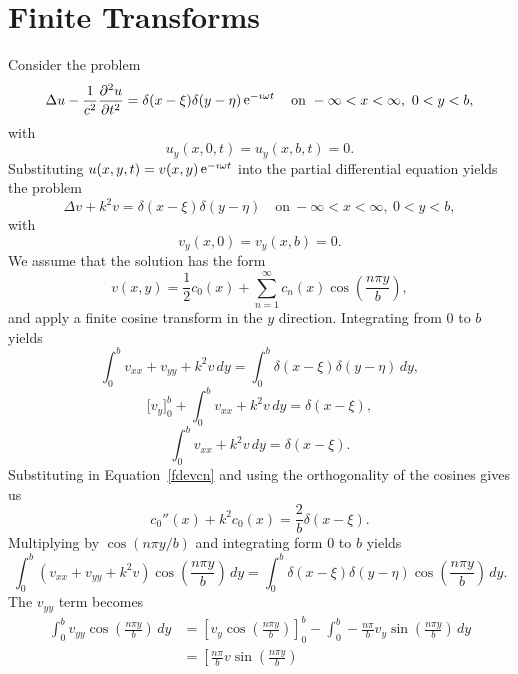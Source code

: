 \flushbottom




\chapter{Finite Transforms}





\begin{Example}
  Consider the problem
  \[
  \Delta u - \frac{1}{c^2} \frac{\partial^2 u}{\partial t^2} 
  = \delta(x-\xi)\delta(y-\eta) \mathop{\mathrm{e}}\nolimits^{-\imath \omega t} \quad \mathrm{on}\  
  -\infty < x < \infty,\ 0 < y < b,
  \]
  with
  \[
  u_y(x,0,t) = u_y(x,b,t) = 0.
  \]
  Substituting $u(x,y,t) = v(x,y) \mathop{\mathrm{e}}\nolimits^{-\imath \omega t}$ into the partial differential 
  equation yields the problem
  \[
  \Delta v + k^2 v 
  = \delta(x-\xi)\delta(y-\eta) \quad \mathrm{on}\  
  -\infty < x < \infty,\ 0 < y < b,
  \]
  with
  \[
  v_y(x,0) = v_y(x,b) = 0.
  \]
  We assume that the solution has the form
  \begin{equation}
    \label{fdevcn}
    v(x,y) = \frac{1}{2} c_0(x) + \sum_{n = 1}^\infty c_n(x) \cos\left(\frac{n \pi y}{b} 
    \right),
  \end{equation}
  and apply a finite cosine transform in the $y$ direction.
  Integrating from $0$ to $b$ yields
  \[
  \int_0^b v_{x x} + v_{y y} + k^2 v \,d y 
  = \int_0^b \delta(x-\xi) \delta(y-\eta)\,d y,
  \]
  \[
  \big[ v_y \big]_0^b + \int_0^b v_{x x} + k^2 v \,d y = \delta(x-\xi),
  \]
  \[
  \int_0^b v_{x x} + k^2 v \,d y = \delta(x-\xi).
  \]
  Substituting in Equation~\ref{fdevcn} and using the orthogonality of the
  cosines gives us
  \[
  \boxed{
    c_0''(x) + k^2 c_0(x) = \frac{2}{b} \delta(x-\xi).
    }
  \]
  Multiplying by $\cos(n \pi y/b)$ and integrating form $0$ to $b$ yields
  \[
  \int_0^b \left( v_{x x} + v_{y y} + k^2 v \right) 
  \cos\left(\frac{n\pi y}{b} \right)\,d y 
  = \int_0^b \delta(x-\xi) \delta(y-\eta) \cos\left(\frac{n\pi y}{b}\right)\,d y.
  \]
  The $v_{y y}$ term becomes
  \begin{align*}
    \int_0^b v_{y y} \cos\left(\frac{n\pi y}{b} \right)\,d y 
    &= \left[ v_y \cos\left(\frac{n\pi y}{b} \right) \right]_0^b -
    \int_0^b - \frac{n\pi}{b} v_y \sin\left(\frac{n\pi y}{b} \right) \,d y \\
    &= \left[ \frac{n\pi}{b} v \sin\left(\frac{n\pi y}{b} \right) 

\end{align*}
\end{Example}
